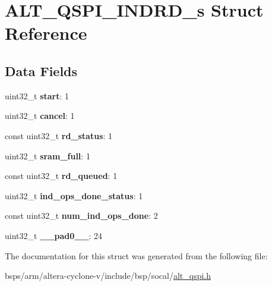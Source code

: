 \hypertarget{structALT__QSPI__INDRD__s}{}\section{A\+L\+T\+\_\+\+Q\+S\+P\+I\+\_\+\+I\+N\+D\+R\+D\+\_\+s Struct Reference}
\label{structALT__QSPI__INDRD__s}
\subsection*{Data Fields}
\begin{DoxyCompactItemize}
\item 
\mbox{\label{structALT__QSPI__INDRD__s_a64b62de74421bb4cf9042f7bc5c9207e}} 
uint32\+\_\+t {\bfseries start}\+: 1
\item 
\mbox{\label{structALT__QSPI__INDRD__s_a6bdae357135873c8bd0c913b05d3f1fc}} 
uint32\+\_\+t {\bfseries cancel}\+: 1
\item 
\mbox{\label{structALT__QSPI__INDRD__s_ac9c3aadd28a52ff4d03cece6bf234d54}} 
const uint32\+\_\+t {\bfseries rd\+\_\+status}\+: 1
\item 
\mbox{\label{structALT__QSPI__INDRD__s_ad6e277dc51c6101d45c3bb4cc2446df9}} 
uint32\+\_\+t {\bfseries sram\+\_\+full}\+: 1
\item 
\mbox{\label{structALT__QSPI__INDRD__s_a831f2951b8a54d8af7d1ad4dfba41ea6}} 
const uint32\+\_\+t {\bfseries rd\+\_\+queued}\+: 1
\item 
\mbox{\label{structALT__QSPI__INDRD__s_a75ffaa20ee583b17edd1a9403ef1f2b3}} 
uint32\+\_\+t {\bfseries ind\+\_\+ops\+\_\+done\+\_\+status}\+: 1
\item 
\mbox{\label{structALT__QSPI__INDRD__s_a6e4d5a2fdbb52094fd8d87d560bdc2de}} 
const uint32\+\_\+t {\bfseries num\+\_\+ind\+\_\+ops\+\_\+done}\+: 2
\item 
\mbox{\label{structALT__QSPI__INDRD__s_acba08adbd4cffc7dc6ec8acf4e59e4c2}} 
uint32\+\_\+t {\bfseries \+\_\+\+\_\+pad0\+\_\+\+\_\+}\+: 24
\end{DoxyCompactItemize}


The documentation for this struct was generated from the following file\+:\begin{DoxyCompactItemize}
\item 
bsps/arm/altera-\/cyclone-\/v/include/bsp/socal/\mbox{\hyperlink{include_2bsp_2socal_2alt__qspi_8h}{alt\+\_\+qspi.\+h}}\end{DoxyCompactItemize}
